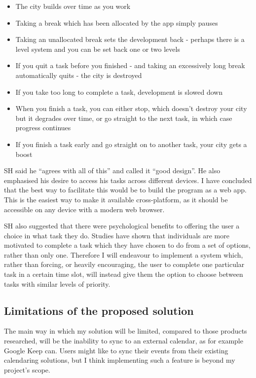 \documentclass{article}
\begin{document}
\begin{samepage}
	\begin{itemize}
		\item The city builds over time as you work
		\item Taking a break which has been allocated by the app simply pauses

		\item Taking an unallocated break sets the development back - perhaps there is a
		      level system and you can be set back one or two levels
		\item If you quit a task before you finished - and taking an excessively long
		      break automatically quits - the city is destroyed
		\item If you take too long to complete a task, development is slowed down
		\item When you finish a task, you can either stop, which doesn't destroy your
		      city but it degrades over time, or go straight to the next task, in which case
		      progress continues
		\item If you finish a task early and go straight on to another task, your city
		      gets a boost
	\end{itemize}
\end{samepage}

SH said he ``agrees with all of this'' and called it ``good design''. He also
emphasised his desire to access his tasks across different devices. I have
concluded that the best way to facilitate this would be to build the program as
a web app. This is the easiest way to make it available cross-platform, as it
should be accessible on any device with a modern web browser.

SH also suggested that there were psychological benefits to offering the user a
choice in what task they do. Studies have shown that individuals are more
motivated to complete a task which they have chosen to do from a set of options,
rather than only one. Therefore I will endeavour to implement a system which,
rather than forcing, or heavily encouraging, the user to complete one particular
task in a certain time slot, will instead give them the option to choose between
tasks with similar levels of priority.

\subsection{Limitations of the proposed solution}
The main way in which my solution will be limited,
compared to those products researched,
will be the inability to sync to an external calendar,
as for example Google Keep can.
Users might like to sync their events from their existing calendaring solutions,
but I think implementing such a feature is beyond my project's scope.
\end{document}
